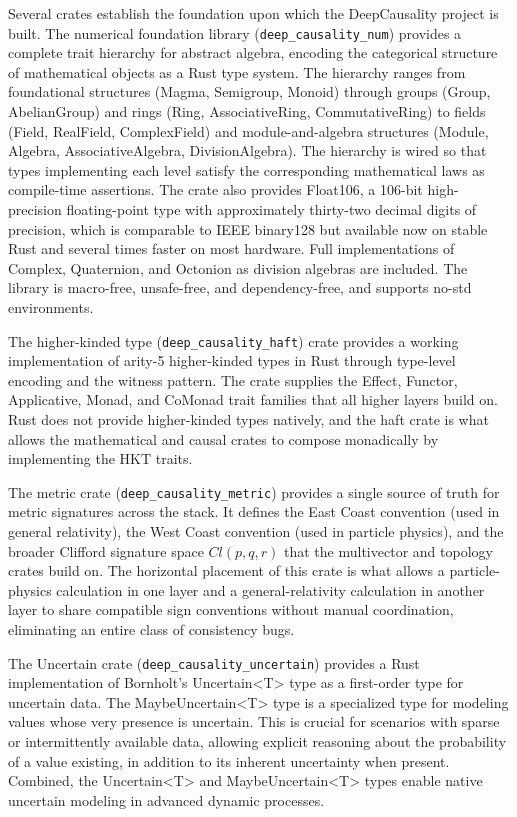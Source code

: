Several crates establish the foundation upon which the DeepCausality project is built. The numerical foundation library (\texttt{deep\_causality\_num}) provides a complete trait hierarchy for abstract algebra, encoding the categorical structure of mathematical objects as a Rust type system. The hierarchy ranges from foundational structures (Magma, Semigroup, Monoid) through groups (Group, AbelianGroup) and rings (Ring, AssociativeRing, CommutativeRing) to fields (Field, RealField, ComplexField) and module-and-algebra structures (Module, Algebra, AssociativeAlgebra, DivisionAlgebra). The hierarchy is wired so that types implementing each level satisfy the corresponding mathematical laws as compile-time assertions. The crate also provides Float106, a 106-bit high-precision floating-point type with approximately thirty-two decimal digits of precision, which is comparable to IEEE binary128 but available now on stable Rust and several times faster on most hardware. Full implementations of Complex, Quaternion, and Octonion as division algebras are included. The library is macro-free, unsafe-free, and dependency-free, and supports no-std environments.

The higher-kinded type (\texttt{deep\_causality\_haft}) crate provides a working implementation of arity-5 higher-kinded types in Rust through type-level encoding and the witness pattern. The crate supplies the Effect, Functor, Applicative, Monad, and CoMonad trait families that all higher layers build on. Rust does not provide higher-kinded types natively, and the haft crate is what allows the mathematical and causal crates to compose monadically by implementing the HKT traits.

The metric crate (\texttt{deep\_causality\_metric}) provides a single source of truth for metric signatures across the stack. It defines the East Coast convention (used in general relativity), the West Coast convention (used in particle physics), and the broader Clifford signature space $Cl(p, q, r)$ that the multivector and topology crates build on. The horizontal placement of this crate is what allows a particle-physics calculation in one layer and a general-relativity calculation in another layer to share compatible sign conventions without manual coordination, eliminating an entire class of consistency bugs.

The Uncertain crate (\texttt{deep\_causality\_uncertain}) provides a Rust implementation of Bornholt's Uncertain<T> type as a first-order type for uncertain data\cite{bornholt2014uncertain}. The MaybeUncertain<T> type is a specialized type for modeling values whose very presence is uncertain. This is crucial for scenarios with sparse or intermittently available data, allowing explicit reasoning about the probability of a value existing, in addition to its inherent uncertainty when present. Combined, the Uncertain<T> and MaybeUncertain<T> types enable native uncertain modeling in advanced dynamic processes.

